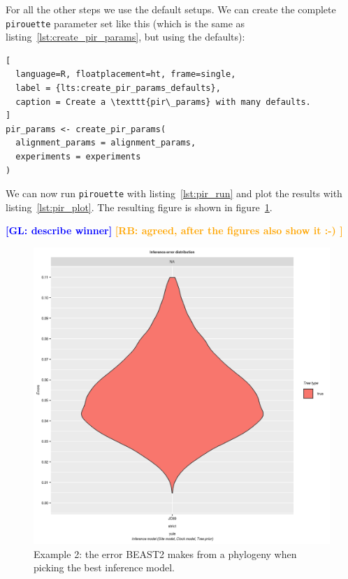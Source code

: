 \documentclass{article}
\newcommand{\giovanni}[1]{\textcolor{blue}{\textbf{[GL: #1]}}}
\newcommand{\richel}[1]{\textcolor{orange}{\textbf{[RB: #1]}}}
\begin{document}
For all the other steps we use the default setups. 
We can create the complete
\verb;pirouette; parameter set like this (which is the
same as listing~\ref{lst:create_pir_params}, but using the defaults):

\begin{lstlisting}[
  language=R, floatplacement=ht, frame=single,
  label = {lts:create_pir_params_defaults},
  caption = Create a \texttt{pir\_params} with many defaults.
]
pir_params <- create_pir_params(
  alignment_params = alignment_params,
  experiments = experiments
)
\end{lstlisting}

We can now run \verb;pirouette;  with listing~\ref{lst:pir_run}
and plot the results with listing~\ref{lst:pir_plot}.
The resulting figure is shown in figure~\ref{fig:example_2}.

\giovanni{describe winner}
\richel{agreed, after the figures also show it :-) }

\begin{figure}[ht]
  \includegraphics[width=\textwidth]{example_2/errors.png}
  \caption{
    Example 2: the error BEAST2 makes from a phylogeny when
    picking the best inference model.
  }
  \label{fig:example_2}
\end{figure}

\end{document}
